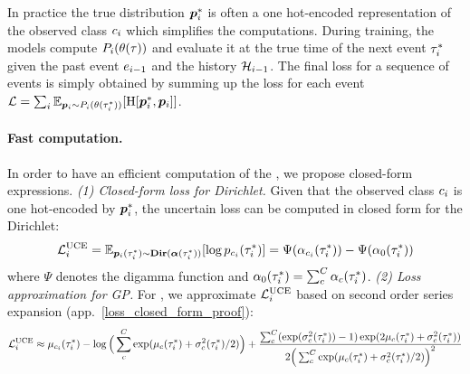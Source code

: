 In practice the true distribution $\bm{p}_{i}^*$ is often a one hot-encoded representation of the observed class $c_{i}$ which simplifies the computations. During training, the models compute $P_{i}(\theta(\tau))$ and evaluate it at the true time of the next event $\tau_{i}^*$ given the past event $e_{i-1}$ and the history $\mathcal{H}_{i-1}$. The final loss for a sequence of events is simply obtained by summing up the loss for each event
$\mathcal{L}=\sum_i \operatorname{\mathbb{E}}_{\bm{p}_{i} \sim P_{i}(\theta(\tau_{i}^*))}[\operatorname{H}[\bm{p}_{i}^*, \bm{p}_{i}]]$.

\paragraph{Fast computation.}  In order to have an efficient computation of the \UncertaintyLoss, we propose closed-form expressions.
\textit{(1) Closed-form loss for Dirichlet.} Given that the observed class $c_i$ is one hot-encoded by $\bm{p}_i^*$, the uncertain loss can be computed in closed form for the Dirichlet:
\begin{equation} \label{eq:dir_loss}
\mathcal{L}_i^{\text{UCE}} = \operatorname{\mathbb{E}}_{\bm{p}_i(\tau_i^*) \sim \textbf{Dir}(\bm{\alpha}(\tau_i^*))}[\log p_{c_i}(\tau_i^*)] = \Psi(\alpha_{c_i}(\tau_i^*)) - \Psi(\alpha_0(\tau_i^*))
\end{equation}
where $\Psi$ denotes the digamma function and $\alpha_0(\tau_i^*) = \sum_c^C \alpha_c(\tau_i^*)$.
\textit{(2) Loss approximation for GP.} For \GPModel, we approximate $ \mathcal{L}_i^{\text{UCE}}$ based on second order series expansion (app.~\ref{loss_closed_form_proof}):
\small
\begin{equation} \label{eq:gp_loss}
    \mathcal{L}_i^{\text{UCE}}
    \approx \mu_{c_i}(\tau_i^*) - \log \Big( \sum_c^C \exp(\mu_c(\tau_i^*) + \sigma_c^2(\tau_i^*) / 2) \Big) +
        \frac{\sum_c^C (\exp(\sigma_c^2(\tau_i^*)) - 1) \exp(2 \mu_c(\tau_i^*) + \sigma_c^2(\tau_i^*))}
        {2 \Big( \sum_c^C \exp(\mu_c(\tau_i^*) + \sigma_c^2(\tau_i^*) / 2) \Big)^2}
\end{equation}
\normalsize

